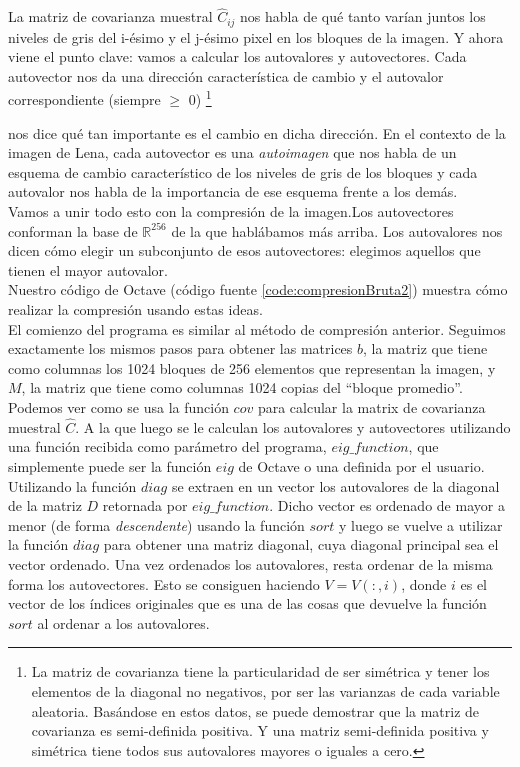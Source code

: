 \documentclass[twocolumn,a4paper,10pt]{article}
\begin{document}
La matriz de covarianza muestral $\widehat{C}_{ij}$ nos habla de qu\'e tanto var\'ian juntos los niveles de gris del i-\'esimo y el j-\'esimo pixel en los bloques 
de la imagen. Y ahora viene  el punto clave: vamos a calcular los autovalores y autovectores. Cada autovector nos da una direcci\'on caracter\'istica de cambio y 
el autovalor correspondiente  (siempre $\geq$ 0) \footnote{La matriz de covarianza tiene la particularidad de ser sim\'etrica y tener los elementos de la diagonal no negativos, por ser las 
varianzas de cada variable aleatoria. Bas\'andose en estos datos, se puede demostrar que la matriz de covarianza es semi-definida positiva. Y una matriz semi-definida 
positiva y sim\'etrica tiene todos sus autovalores mayores o iguales a cero.}

 nos dice qu\'e tan importante es el cambio en dicha direcci\'on. En el contexto de la imagen de Lena, cada autovector es una \textit{autoimagen}
que nos habla de un esquema de cambio caracter\'istico de los niveles de gris de los bloques y cada autovalor nos habla de la importancia de ese esquema frente 
a los dem\'as. \\

Vamos a unir todo esto con la compresi\'on de la imagen.Los autovectores conforman la base de $\mathbb{R}^{256}$ de la que habl\'abamos m\'as arriba. 
Los autovalores nos dicen c\'omo elegir un subconjunto de esos autovectores: elegimos aquellos que tienen el mayor autovalor. \\

Nuestro c\'odigo de Octave (c\'odigo fuente \ref{code:compresionBruta2}) muestra c\'omo realizar la compresi\'on usando estas ideas. \\

El comienzo del programa es similar al m\'etodo de compresi\'on anterior. Seguimos exactamente los mismos pasos para obtener las matrices $b$, la matriz que tiene como 
columnas los 1024 bloques de 256 elementos que representan la imagen, y $M$, la matriz que tiene como columnas 1024 copias del ``bloque promedio''.\\ 

Podemos ver como se usa la función $cov$ para calcular la matrix de covarianza muestral $\widehat{C}$. A la que luego se le calculan los autovalores y autovectores
utilizando una funci\'on recibida como par\'ametro del programa, $eig\_function$, que simplemente puede ser la funci\'on $eig$ de Octave o una definida por el usuario.
Utilizando la función $diag$ se extraen en un vector los autovalores de la diagonal de la matriz $D$ retornada por $eig\_function$. Dicho vector es ordenado de 
mayor a menor (de forma \textit{descendente}) usando la funci\'on $sort$ y luego se vuelve a utilizar la funci\'on $diag$ para obtener una matriz diagonal, cuya 
diagonal principal sea el vector ordenado. Una vez ordenados los autovalores, resta ordenar de la misma forma los autovectores. Esto se consiguen haciendo $V = V(:,i)$,
donde $i$ es el vector de los \'indices originales que es una de las cosas que devuelve la funci\'on $sort$ al ordenar a los autovalores.\\
\end{document}
